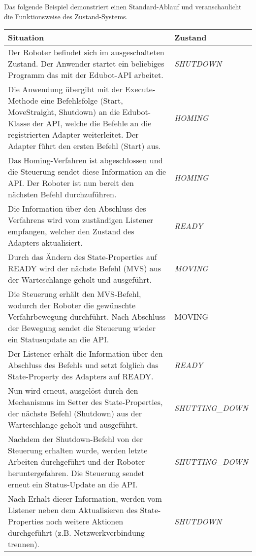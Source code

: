 \newline
Das folgende Beispiel demonstriert einen Standard-Ablauf und veranschaulicht die Funktionsweise des Zustand-Systems.
\newline
\newline
\begin{tabular}{|p{10cm}|p{4cm}|}
\hline \rowcolor{lightgray} \hline
\textbf{Situation} & \textbf{Zustand}\\
\hline
Der Roboter befindet sich im ausgeschalteten Zustand. Der Anwender startet ein beliebiges Programm das mit der Edubot-API arbeitet. & \textit{SHUTDOWN}\\
\hline
Die Anwendung übergibt mit der Execute-Methode eine Befehlsfolge (Start, MoveStraight, Shutdown) an die Edubot-Klasse der API, welche die Befehle an die registrierten Adapter weiterleitet. Der Adapter führt den ersten Befehl (Start) aus. & \textit{HOMING}\\
\hline
Das Homing-Verfahren ist abgeschlossen und die Steuerung sendet diese Information an die API. Der Roboter ist nun bereit den nächsten Befehl durchzuführen. & \textit{HOMING}\\
\hline
Die Information über den Abschluss des Verfahrens wird vom zuständigen Listener empfangen, welcher den Zustand des Adapters aktualisiert. & \textit{READY}\\
\hline
Durch das Ändern des State-Properties auf READY wird der nächste Befehl (MVS) aus der Warteschlange geholt und ausgeführt. & \textit{MOVING}\\
\hline
Die Steuerung erhält den MVS-Befehl, wodurch der Roboter die gewünschte Verfahrbewegung durchführt. Nach Abschluss der Bewegung sendet die Steuerung wieder ein Statusupdate an die API.	 & MOVING\\
\hline
Der Listener erhält die Information über den Abschluss des Befehls und setzt folglich das State-Property des Adapters auf READY. & \textit{READY}\\
\hline
Nun wird erneut, ausgelöst durch den Mechanismus im Setter des State-Properties, der nächste Befehl (Shutdown) aus der Warteschlange geholt und ausgeführt. & \textit{SHUTTING\_DOWN}\\
\hline
Nachdem der Shutdown-Befehl von der Steuerung erhalten wurde, werden letzte Arbeiten durchgeführt und der Roboter heruntergefahren. Die Steuerung sendet erneut ein Status-Update an die API. & \textit{SHUTTING\_DOWN}\\
\hline
Nach Erhalt dieser Information, werden vom Listener neben dem Aktualisieren des State-Properties noch weitere Aktionen durchgeführt (z.B. Netzwerkverbindung trennen). & \textit{SHUTDOWN}\\
\hline
\end{tabular}